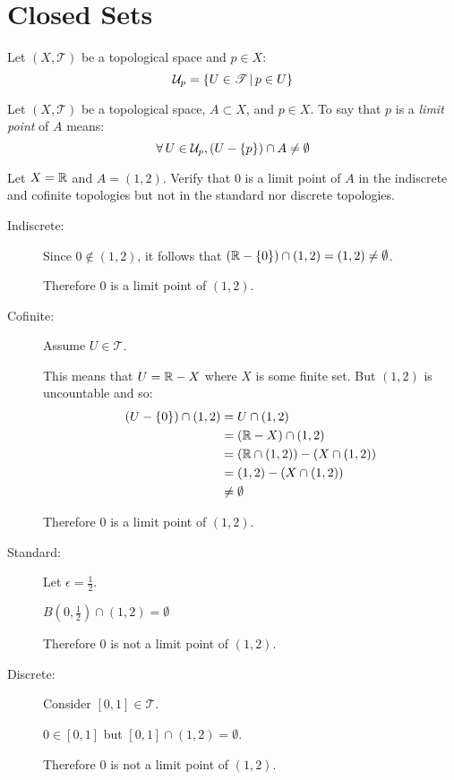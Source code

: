 \documentclass[letterpaper,12pt,fleqn]{article}
\newcommand{\T}{\mathscr{T}}
\newcommand{\U}{\mathcal{U}}
\newcommand{\e}{\epsilon}
\begin{document}
\section*{Closed Sets}

\begin{notation}
  Let \((X,\T)\) be a topological space and \(p\in X\):
  \[\U_p=\setb{U\in\T}{p\in U}\]
\end{notation}

\begin{definition}
  Let \((X,\T)\) be a topological space, \(A\subset X\), and \(p\in X\).  To say that \(p\) is a \emph{limit point}
  of \(A\) means:
  \[\forall\,U\in\U_p,(U-\set{p})\cap A\ne\emptyset\]
\end{definition}

\begin{example}
  Let \(X=\mathbb{R}\) and \(A=(1,2)\).  Verify that \(0\) is a limit point of \(A\) in the indiscrete and cofinite
  topologies but not in the standard nor discrete topologies.

  \begin{description}
  \item[Indiscrete:] Since \(0\notin(1,2)\), it follows that \((\mathbb{R}-\{0\})\cap (1,2)=(1,2)\ne\emptyset\).

    Therefore \(0\) is a limit point of \((1,2)\).

  \item[Cofinite:] Assume \(U\in\T\).

    This means that \(U=\mathbb{R}-X\) where \(X\) is some finite set.  But \((1,2)\) is uncountable and so:
    \begin{align*}
      (U-\{0\})\cap(1,2) &= U\cap(1,2) \\
      &= (\mathbb{R}-X)\cap(1,2) \\
      &= (\mathbb{R}\cap(1,2))-(X\cap(1,2)) \\
      &= (1,2)-(X\cap(1,2)) \\
      &\ne\emptyset
    \end{align*}

    Therefore \(0\) is a limit point of \((1,2)\).

  \item[Standard:] Let \(\e=\frac{1}{2}\).

    \(B(0,\frac{1}{2})\cap(1,2)=\emptyset\)

    Therefore \(0\) is not a limit point of \((1,2)\).

  \item[Discrete:] Consider \([0,1]\in\T\).

    \(0\in[0,1]\) but \([0,1]\cap(1,2)=\emptyset\).

    Therefore \(0\) is not a limit point of \((1,2)\).
  \end{description}
\end{example}
\end{document}
